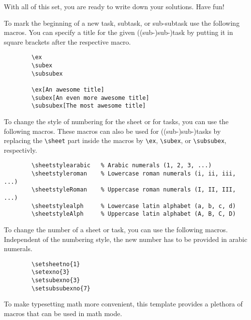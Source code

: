 \documentclass[10pt,a4paper,english]{article}
\begin{document}
    With all of this set, you are ready to write down your solutions.
    Have fun!

    \pagebreak
    To mark the beginning of a new task, subtask, or sub-subtask use the following macros.
    You can specify a title for the given ((sub-)sub-)task by putting it in square brackets after the respective macro.
    \begin{verbatim}
        \ex
        \subex
        \subsubex

        \ex[An awesome title]
        \subex[An even more awesome title]
        \subsubex[The most awesome title]
    \end{verbatim}

    To change the style of numbering for the sheet or for tasks, you can use the following macros.
    These macros can also be used for ((sub-)sub-)tasks by replacing the \verb|\sheet| part inside the macros by \verb|\ex|, \verb|\subex|, or \verb|\subsubex|, respectivly.
    \begin{verbatim}
        \sheetstylearabic   % Arabic numerals (1, 2, 3, ...)
        \sheetstyleroman    % Lowercase roman numerals (i, ii, iii, ...)
        \sheetstyleRoman    % Uppercase roman numerals (I, II, III, ...)
        \sheetstylealph     % Lowercase latin alphabet (a, b, c, d)
        \sheetstyleAlph     % Uppercase latin alphabet (A, B, C, D)
    \end{verbatim}

    To change the number of a sheet or task, you can use the following macros.
    Independent of the numbering style, the new number has to be provided in arabic numerals.
    \begin{verbatim}
        \setsheetno{1}
        \setexno{3}
        \setsubexno{3}
        \setsubsubexno{7}
    \end{verbatim}

    \pagebreak
    \newcommand{\coderow}[2]{\texttt{#1} & $#1$ & #2 \\}
    To make typesetting math more convenient, this template provides a plethora of macros that can be used in math mode.
    
\end{document}
